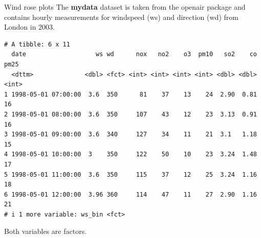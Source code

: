 \documentclass[
  ignorenonframetext,
]{beamer}
\newenvironment{Shaded}{\begin{snugshade}}{\end{snugshade}}
\newcommand{\AttributeTok}[1]{\textcolor[rgb]{0.13,0.29,0.53}{#1}}
\newcommand{\CommentTok}[1]{\textcolor[rgb]{0.56,0.35,0.01}{\textit{#1}}}
\newcommand{\ConstantTok}[1]{\textcolor[rgb]{0.56,0.35,0.01}{#1}}
\newcommand{\DecValTok}[1]{\textcolor[rgb]{0.00,0.00,0.81}{#1}}
\newcommand{\FunctionTok}[1]{\textcolor[rgb]{0.13,0.29,0.53}{\textbf{#1}}}
\newcommand{\NormalTok}[1]{#1}
\newcommand{\OtherTok}[1]{\textcolor[rgb]{0.56,0.35,0.01}{#1}}
\newcommand{\SpecialCharTok}[1]{\textcolor[rgb]{0.81,0.36,0.00}{\textbf{#1}}}
\begin{document}
\begin{frame}[fragile]{Wind rose plots}
\label{wind-rose-plots-1}
The \textbf{mydata} dataset is taken from the openair package and
contains hourly measurements for windspeed (ws) and direction (wd) from
London in 2003.


\begin{Shaded}
\end{Shaded}

\begin{verbatim}
# A tibble: 6 x 11
  date                   ws wd      nox   no2    o3  pm10   so2    co  pm25
  <dttm>              <dbl> <fct> <int> <int> <int> <int> <dbl> <dbl> <int>
1 1998-05-01 07:00:00  3.6  350      81    37    13    24  2.90  0.81    16
2 1998-05-01 08:00:00  3.6  350     107    43    12    23  3.13  0.91    16
3 1998-05-01 09:00:00  3.6  340     127    34    11    21  3.1   1.18    15
4 1998-05-01 10:00:00  3    350     122    50    10    23  3.24  1.48    17
5 1998-05-01 11:00:00  3.6  350     115    37    12    25  3.24  1.16    18
6 1998-05-01 12:00:00  3.96 360     114    47    11    27  2.90  1.16    21
# i 1 more variable: ws_bin <fct>
\end{verbatim}

Both variables are factors.
\end{frame}
\end{document}
